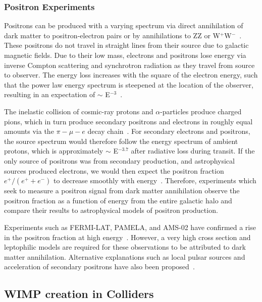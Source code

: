 \subsubsection{Positron Experiments}

Positrons can be produced with a varying spectrum via direct annihilation of dark matter to positron-electron pairs or by annihilations to ZZ or W$^+$W$^-$~\cite{Cheng,Kamionkowsk}.  These positrons do not travel in straight lines from their source due to galactic magnetic fields.  Due to their low mass, electrons and positrons lose energy via inverse Compton scattering and synchrotron radiation as they travel from source to observer. The energy loss increases with the square of the electron energy, such that the power law energy spectrum is steepened at the location of the observer, resulting in an expectation of $\sim$ E$^{-3}$~\cite{PEBS}. 

The inelastic collision of cosmic-ray protons and $\alpha$-particles produce charged pions, which in turn produce secondary positrons and electrons in roughly equal amounts via the $\pi-\mu-e$ decay chain~\cite{Stecker}.  For secondary electrons and positrons, the source spectrum would therefore follow the energy spectrum of ambient protons, which is approximately $\sim$ E$^{-3.7}$ after radiative loss during transit.  If the only source of positrons was from secondary production, and astrophysical sources produced electrons, we would then expect the positron fraction $e^+/(e^+ + e^-)$ to decrease smoothly with energy~\cite{PEBS}. Therefore, experiments which seek to measure a positron signal from dark matter annihilation observe the positron fraction as a function of energy from the entire galactic halo and compare their results to astrophysical models of positron production.

Experiments such as FERMI-LAT, PAMELA, and AMS-02 have confirmed a rise in the positron fraction at high energy~\cite{FermiPositron,PamelaPositron,AMSPositron}. However, a very high cross section and leptophilic models are required for these observations to be attributed to dark matter annihilation.  Alternative explanations such as local pulsar sources and acceleration of secondary positrons have also been proposed~\cite{Serpico}.



\subsection{WIMP creation in Colliders}\label{LHCWIMP}


